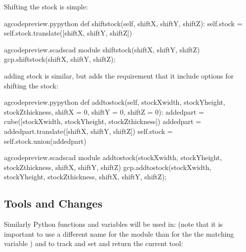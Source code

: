 \documentclass{ltxdoc}
\begin{document}
Shifting the stock is simple:

\lstset{firstnumber=\thegcpy}
\begin{writecode}{a}{gcodepreview.py}{python}
    def shiftstock(self, shiftX, shiftY, shiftZ):
         self.stock = self.stock.translate([shiftX, shiftY, shiftZ])
        
\end{writecode}
\addtocounter{gcpy}{3}

\lstset{firstnumber=\thegcpscad}
\begin{writecode}{a}{gcodepreview.scad}{scad}
module shiftstock(shiftX, shiftY, shiftZ) {
    gcp.shiftstock(shiftX, shiftY, shiftZ);
}

\end{writecode}
\addtocounter{gcpscad}{4}

adding stock is similar, but adds the requirement that it include options for shifting the stock:

\lstset{firstnumber=\thegcpy}
\begin{writecode}{a}{gcodepreview.py}{python}
    def addtostock(self, stockXwidth, stockYheight, stockZthickness, 
                         shiftX = 0, 
                         shiftY = 0, 
                         shiftZ = 0):
         addedpart = cube([stockXwidth, stockYheight, stockZthickness])
         addedpart = addedpart.translate([shiftX, shiftY, shiftZ])
         self.stock = self.stock.union(addedpart)
        
\end{writecode}
\addtocounter{gcpy}{8}

\lstset{firstnumber=\thegcpscad}
\begin{writecode}{a}{gcodepreview.scad}{scad}
module addtostock(stockXwidth, stockYheight, stockZthickness, shiftX, shiftY, shiftZ) {
    gcp.addtostock(stockXwidth, stockYheight, stockZthickness, shiftX, shiftY, shiftZ);
}

\end{writecode}
\addtocounter{gcpscad}{4}

\subsection{Tools and Changes}
 
Similarly Python functions and variables will be used in:  (note that it is important to use a different name for the module than for the the matching variable ) and  to track and set and return the current tool:
\end{document}

